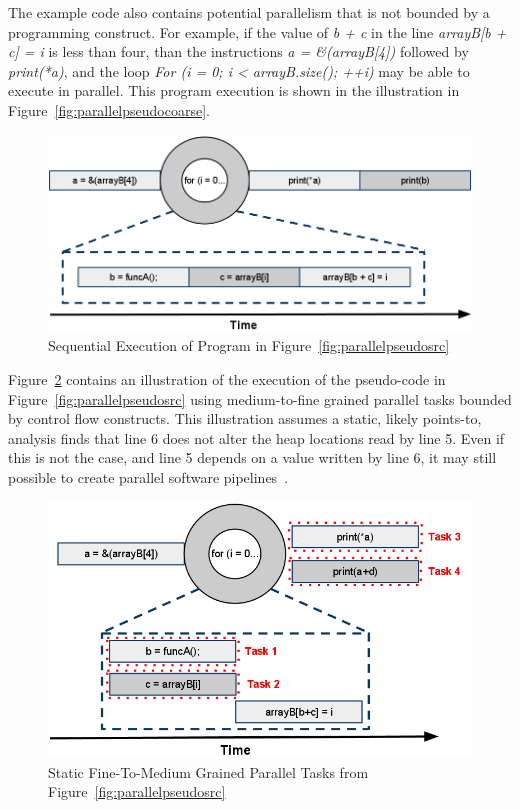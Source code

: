 \documentclass[defaultstyle,11pt]{thesis}
\begin{document}
The example code also contains potential parallelism that is not
bounded by a programming construct.  For example, if the value of
\textit{b + c} in the line \textit{arrayB[b + c] = i} is less than
four, than the instructions \textit{ a = \&(arrayB[4])} followed by
\textit{print(*a)}, and the loop \textit{For (i = 0; i <
  arrayB.size(); ++i)} may be able to execute in parallel.  This
program execution is shown in the illustration in
Figure~\ref{fig:parallelpseudocoarse}.

\begin{figure}
\begin{center}
\includegraphics[width=6in]{images/ParallelTasksSequential}
\end{center}
\caption{Sequential Execution of Program in Figure~\ref{fig:parallelpseudosrc}}
\label{fig:parallelpseudoseq}
\end{figure}

Figure~\ref{fig:parallelpseudomedcntl} contains an illustration of
the execution of the pseudo-code in Figure~\ref{fig:parallelpseudosrc}
using medium-to-fine grained parallel tasks bounded by control flow
constructs.  This illustration assumes a static, likely points-to,
analysis finds that line 6 does not alter the heap locations read by
line 5.  Even if this is not the case, and line 5 depends on a value
written by line 6, it may still possible to create parallel software
pipelines~\cite{rangan:04:pact, giacomoni:08:ppopp}.

\begin{figure}
\begin{center}
\includegraphics[width=5in]{images/ParallelTasksMedControl}
\end{center}
\caption{Static Fine-To-Medium Grained Parallel Tasks from Figure~\ref{fig:parallelpseudosrc}}
\label{fig:parallelpseudomedcntl}
\end{figure}
\end{document}
